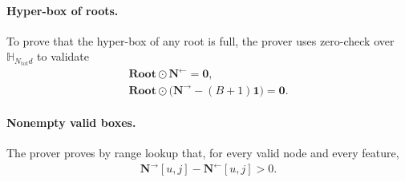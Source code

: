 \paragraph{Hyper-box of roots.}
To prove that the hyper-box of any root is full, the prover uses zero-check over $\mathbb{H}_{N_{\mathrm{tot}}d}$ to validate
    \begin{align}
        \mathbf{Root} \odot \mathbf{N}^{\leftarrow} = \mathbf{0}, \\
        \mathbf{Root} \odot \bigl(\mathbf{N}^{\rightarrow} - (B + 1)\mathbf{1}\bigr) = \mathbf{0}.
    \end{align}

\paragraph{Nonempty valid boxes.}
The prover proves by range
lookup that, for every valid node and every feature,
\begin{align}
    \mathbf{N}^{\rightarrow}[u,j]-\mathbf{N}^{\leftarrow}[u,j] > 0.
\end{align}

